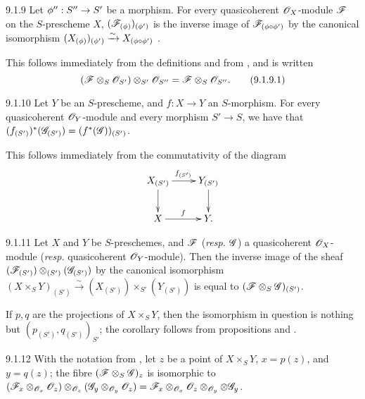 \documentclass[10pt,oneside]{book}
\begin{document}
\begin{envs}[Proposition]{9.1.9}
\label{prop-1.9.1.9}
Let $\phi'':S''\to S'$ be a morphism.
For every quasicoherent $\mathscr{O}_X$-module $\mathscr{F}$ on the $S$-prescheme $X$,
$(\mathscr{F}_{(\phi)})_{(\phi')}$ is the inverse image of
$\mathscr{F}_{(\phi\circ\phi')}$ by the canonical isomorphism
$(X_{(\phi)})_{(\phi')}\xrightarrow{\sim}X_{(\phi\circ\phi')}$
.
\end{envs}

This follows immediately from the definitions and from , and is
written
\[
  (\mathscr{F}\otimes_S\mathscr{O}_{S'})\otimes_{S'}\mathscr{O}_{S''}=\mathscr{F}\otimes_S\mathscr{O}_{S''}.\tag{9.1.9.1}
\]

\begin{envs}[Proposition]{9.1.10}
\label{prop-1.9.1.10}
Let $Y$ be an $S$-prescheme, and $f:X\to Y$ an $S$-morphism.
For every quasicoherent $\mathscr{O}_Y$-module and every morphism
$S'\to S$, we have that
$(f_{(S')})^*(\mathscr{G}_{(S')})=(f^*(\mathscr{G}))_{(S')}$.
\end{envs}

This follows immediately from the commutativity of the diagram
\[
  \xymatrix{
    X_{(S')}\ar[r]^{f_{(S')}}\ar[d] & Y_{(S')}\ar[d]\\
    X\ar[r]^f & Y.
  }
\]

\begin{envs}[Corollary]{9.1.11}
\label{cor-1.9.1.11}
Let $X$ and $Y$ be $S$-preschemes, and
$\mathscr{F}$ (\emph{resp.} $\mathscr{G}$) a quasicoherent $\mathscr{O}_X$-module
(\emph{resp.} quasicoherent $\mathscr{O}_Y$-module). Then the inverse image of the sheaf
$(\mathscr{F}_{(S')})\otimes_{(S')}(\mathscr{G}_{(S')})$ by the canonical isomorphism
$(X\times_S Y)_{(S')}\xrightarrow{\sim}(X_{(S')})\times_{S'}(Y_{(S')})$
 is equal to $(\mathscr{F}\otimes_S\mathscr{G})_{(S')}$.
\end{envs}

If $p,q$ are the projections of $X\times_S Y$, then the isomorphism in question
is nothing but $(p_{(S')}, q_{(S')})_{S'}$; the corollary follows from
propositions  and .

\begin{envs}[Proposition]{9.1.12}
\label{prop-1.9.1.12}
With the notation from , let $z$ be
a point of $X\times_S Y$, $x=p(z)$, and $y=q(z)$; the fibre
$(\mathscr{F}\otimes_S\mathscr{G})_z$ is isomorphic to
$(\mathscr{F}_x\otimes_{\mathscr{O}_x}\mathscr{O}_z)\otimes_{\mathscr{O}_z}(\mathscr{G}_y\otimes_{\mathscr{O}_y}\mathscr{O}_z)
=\mathscr{F}_x\otimes_{\mathscr{O}_x}\mathscr{O}_z\otimes_{\mathscr{O}_y}\otimes\mathscr{G}_y$.
\end{envs}
\end{document}
